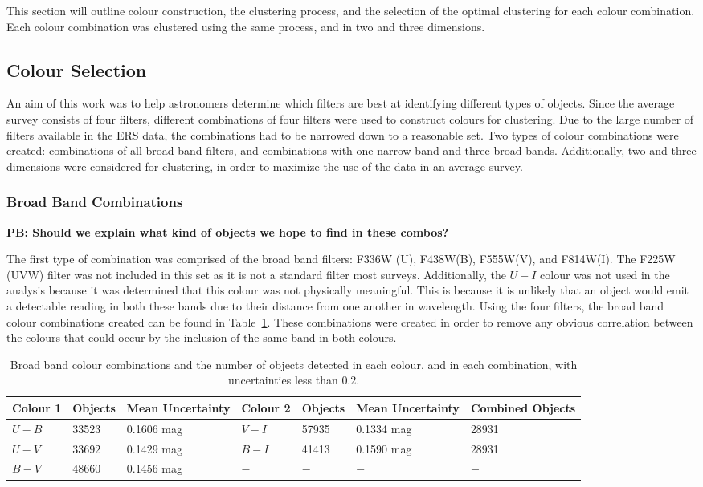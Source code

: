 This section will outline colour construction, the clustering process, and the selection of the optimal clustering for each colour combination.
Each colour combination was clustered using the same process, and in two and three dimensions.

\subsection{Colour Selection}

An aim of this work was to help astronomers determine which filters are best at identifying different types of objects.
Since the average survey consists of four filters, different combinations of four filters were used to construct colours for clustering. 
Due to the large number of filters available in the ERS data, the combinations had to be narrowed down to a reasonable set.
Two types of colour combinations were created: combinations of all broad band filters, and combinations with one narrow band and three broad bands.
Additionally, two and three dimensions were considered for clustering, in order to maximize the use of the data in an average survey.

\subsubsection{Broad Band Combinations}

\textbf{PB: Should we explain what kind of objects we hope to find in these combos?}

The first type of combination was comprised of the broad band filters: F336W (U), F438W(B), F555W(V), and F814W(I).
The F225W (UVW) filter was not included in this set as it is not a standard filter most surveys.
Additionally, the $U - I$ colour was not used in the analysis because it was determined that this colour was not physically meaningful.
This is because it is unlikely that an object would emit a detectable reading in both these bands due to their distance from one another in wavelength.
Using the four filters, the broad band colour combinations created can be found in Table~\ref{tab:BBcolours}.
These combinations were created in order to remove any obvious correlation between the colours that could occur by the inclusion of the same band in both colours.

\begin{table}
\centering
\caption{Broad band colour combinations and the number of objects detected in each colour, and in each combination, with uncertainties less than $0.2$.}
\label{tab:BBcolours}
\begin{tabular}{lllllll}
\hline\hline
Colour 1 & Objects & Mean Uncertainty & Colour 2 & Objects & Mean Uncertainty & Combined Objects \\
\hline
$U - B$ &  33523 & 0.1606 mag & $V - I$ &  57935 & 0.1334 mag & 28931\\
$U - V$ &  33692 & 0.1429 mag & $B - I$ &  41413 & 0.1590 mag & 28931\\
$B - V$ &  48660 & 0.1456 mag & $ - $ & $ - $ & $ - $ & $ - $ \\
\hline
\end{tabular}
\end{table}

